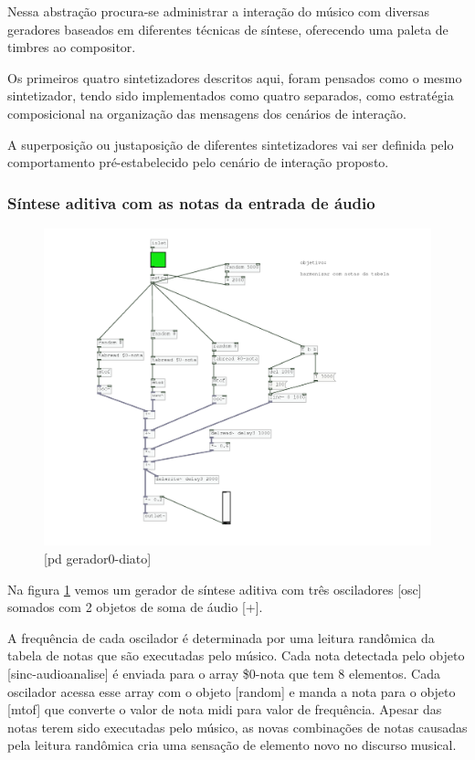 \documentclass[draft]{ppgmus}
\begin{document}
Nessa abstração procura-se administrar a interação do músico
com diversas geradores baseados em diferentes técnicas de síntese,
oferecendo uma paleta de timbres ao compositor.

Os primeiros quatro sintetizadores descritos aqui, foram pensados como o mesmo
sintetizador, tendo sido implementados como quatro separados, como estratégia
composicional na organização das mensagens dos cenários de interação.




A superposição ou justaposição de diferentes sintetizadores vai
ser definida pelo comportamento pré-estabelecido pelo cenário de interação
proposto.





\subsubsection{Síntese aditiva com as notas da entrada de áudio}



\begin{figure}
\includegraphics[scale=.6]{gerador-sintese0-diato}
\caption{[pd gerador0-diato]}
\label{gerador0diato}
\end{figure}

Na figura \ref{gerador0diato} vemos um gerador de síntese
aditiva com três osciladores [osc\texttildelow] somados com
2 objetos de soma de áudio [+\texttildelow].

A frequência de cada oscilador é determinada por uma leitura randômica da
tabela de notas que são executadas pelo músico. Cada nota detectada pelo
objeto [sinc-audioanalise] é enviada para o array \$0-nota que tem 8 elementos.
Cada oscilador acessa esse array com o objeto [random] e manda a nota para o
objeto [mtof] que converte o valor de nota midi para valor de frequência.
Apesar das notas terem sido executadas pelo músico, as novas combinações 
de notas causadas pela leitura randômica cria uma sensação de elemento novo
no discurso musical.
\end{document}
